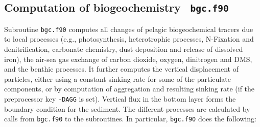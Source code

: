 \documentclass[11pt,a4paper,fleqn,twoside]{article}
\begin{document}
\subsection{\label{computation_of_bgc}Computation of biogeochemistry {\tt
bgc.f90}}

Subroutine {\tt bgc.f90} computes all changes of pelagic biogeochemical tracers
due to local processes (e.g., photosynthesis, heterotrophic processes,
N-Fixation and denitrification, carbonate chemistry, dust deposition and
release of dissolved iron), the air-sea gas exchange of carbon dioxide, oxygen,
dinitrogen and DMS, and the benthic processes. It further computes the vertical
displacement of particles, either using a constant sinking rate for some of the
particulate components, or by computation of aggregation and resulting sinking
rate (if the preprocessor key {\tt -DAGG} is set). Vertical flux
in the bottom layer forms the boundary condition for the sediment. The different
processes are calculated by calls from {\tt bgc.f90} to the subroutines. In
particular, {\tt bgc.f90} does the following:
\end{document}

